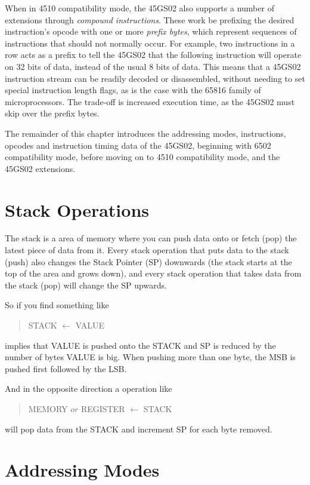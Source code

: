 When in 4510 compatibility mode, the 45GS02 also supports a number
of extensions through {\em compound instructions}. These work be prefixing
the desired instruction's opcode with one or more {\em prefix bytes}, which
represent sequences of instructions that should not normally occur.  For example,
two  instructions in a row acts as a prefix to tell the 45GS02 that the
following instruction will operate on 32 bits of data, instead of the usual 8 bits
of data.  This means that a 45GS02 instruction stream can be readily decoded or disassembled,
without needing to set special instruction length flags, as is the case with the 65816
family of microprocessors. The trade-off is increased execution time, as the 45GS02 must
skip over the prefix bytes.

The remainder of this chapter introduces the addressing modes, instructions, opcodes and
instruction timing data of the 45GS02, beginning with 6502 compatibility mode, before
moving on to 4510 compatibility mode, and the 45GS02 extensions.

\section{Stack Operations}

The stack is a area of memory where you can push data onto or fetch (pop) the latest piece
of data from it. Every stack operation that puts data to the stack (push) also changes the Stack
Pointer (SP) downwards (the stack starts at the top of the area and grows down), and every
stack operation that takes data from the stack (pop) will change the SP upwards.

So if you find something like
\begin{quote}
  STACK $\leftarrow$ VALUE
\end{quote}
implies that VALUE is pushed onto the STACK and SP is reduced by the number of bytes VALUE is
big. When pushing more than one byte, the MSB is pushed first followed by the LSB.

And in the opposite direction a operation like
\begin{quote}
  MEMORY $or$ REGISTER $\leftarrow$ STACK
\end{quote}
will pop data from the STACK and increment SP for each byte removed.

\section{Addressing Modes}

